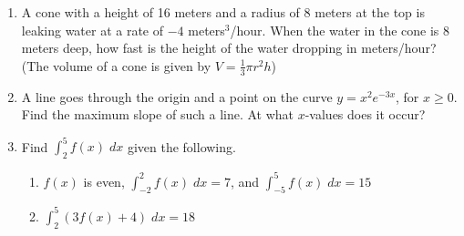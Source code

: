 \documentclass[11pt]{article}
\begin{document}
\begin{enumerate}
  \newpage

\item A cone with a height of 16 meters and a radius of 8 meters at
  the top is leaking water at a rate of $-4$ meters$^3$/hour.  When
  the water in the cone is 8 meters deep, how fast is the height of
  the water dropping in meters/hour? (The volume of a cone is given by
  $V=\frac{1}{3}\pi r^2 h$)
  
\newpage

\item A line goes through the origin and a point on the curve $y=x^2
  e^{-3x}$, for $x\geq 0$.  Find the maximum slope of such a line.  At
  what $x$-values does it occur?

  \newpage

\item Find $\int_2^5 f(x)\;dx$ given the following.
  \begin{enumerate}
  \item $f(x)$ is even, $\int_{-2}^2 f(x)\;dx=7$, and $\int_{-5}^5 f(x)\;dx=15$

    \vfill

  \item $\int_2^5 (3f(x)+4)\;dx = 18$

    \vfill
  \end{enumerate}
  

\end{enumerate}
\end{document}
